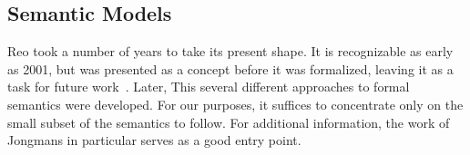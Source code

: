 %
%


\subsection{Semantic Models}
\label{sec:semantic_models}
Reo took a number of years to take its present shape. It is recognizable as early as 2001, but was presented as a concept before it was formalized, leaving it as a task for future work~\cite{jongmans2012overview}. Later, This several different approaches to formal semantics were developed. For our purposes, it suffices to concentrate only on the small subset of the semantics to follow. For additional information, the work of Jongmans in particular serves as a good entry point\cite{jongmans2012overview}.



